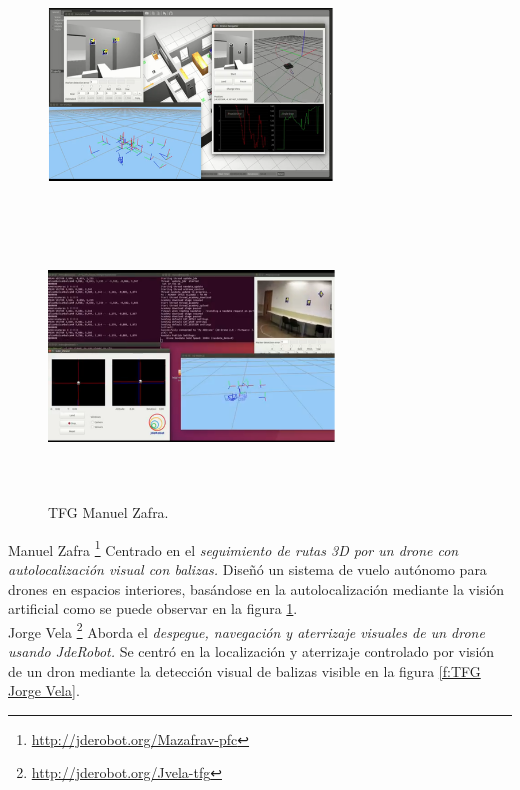 \begin{figure}[H]
 \centering
    \includegraphics[width=7.6cm,height=6.8cm]{imag/IMG9.png}
    \includegraphics[width=7.6cm,height=6.8cm]{imag/IMG10.png}
 \caption{TFG Manuel Zafra.}
 \label{f:TFG Manuel Zafra}
\end{figure} 

\hspace{1cm} Manuel Zafra \footnote{\url{http://jderobot.org/Mazafrav-pfc}} \cite{ManuelZafra} Centrado en el \textit{seguimiento de rutas 3D por un drone con autolocalización visual con balizas.} Diseñó un sistema de vuelo autónomo para drones en espacios interiores, basándose en la autolocalización mediante la visión artificial como se puede observar en la figura \ref{f:TFG Manuel Zafra}.
\\

\hspace{1cm} Jorge Vela \footnote{\url{http://jderobot.org/Jvela-tfg}} \cite{JorgeVela} Aborda el \textit{despegue, navegación y aterrizaje visuales de un drone usando JdeRobot.} Se centró en la localización y aterrizaje controlado por visión de un dron mediante la detección visual de balizas visible en la figura \ref{f:TFG Jorge Vela}.
\\

